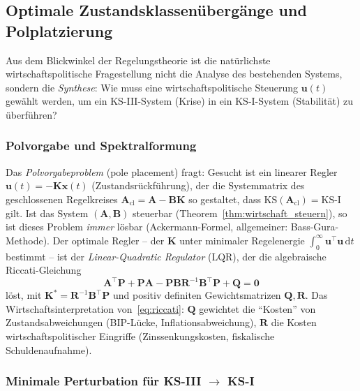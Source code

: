 \documentclass[a4paper, 12pt, twoside, openright]{report}
\theoremstyle{definition}
\theoremstyle{definition}
\newcommand{\vx}{\bm{x}}
\newcommand{\vu}{\bm{u}}
\newcommand{\vA}{\bm{A}}
\newcommand{\vB}{\bm{B}}
\newcommand{\vP}{\bm{P}}
\newcommand{\vQ}{\bm{Q}}
\newcommand{\vK}{\bm{K}}
\newcommand{\vR}{\bm{R}}
\newcommand{\T}{\top}
\newcommand{\KS}{\mathrm{KS}}
\begin{document}
\subsection{Optimale Zustandsklassenübergänge und Polplatzierung}
\label{subsec:polplatz}

Aus dem Blickwinkel der Regelungstheorie ist die natürlichste wirtschaftspolitische
Fragestellung nicht die Analyse des bestehenden Systems, sondern die
\emph{Synthese}: Wie muss eine wirtschaftspolitische Steuerung $\vu(t)$ gewählt
werden, um ein KS-III-System (Krise) in ein KS-I-System (Stabilität)
zu überführen?

\subsubsection*{Polvorgabe und Spektralformung}

Das \emph{Polvorgabeproblem} (pole placement) fragt: Gesucht ist ein linearer
Regler $\vu(t) = -\vK\vx(t)$ (Zustandsrückführung), der die Systemmatrix des
geschlossenen Regelkreises $\vA_{\mathrm{cl}} = \vA - \vB\vK$ so gestaltet, dass
$\KS(\vA_{\mathrm{cl}}) = \KS\text{-I}$ gilt. Ist das System $(\vA, \vB)$ steuerbar
(Theorem~\ref{thm:wirtschaft_steuern}), so ist dieses Problem \emph{immer} lösbar
(Ackermann-Formel, allgemeiner: Bass-Gura-Methode). Der optimale Regler -- der
$\vK$ unter minimaler Regelenergie $\int_0^\infty \vu^\T\vu\,\mathrm{d}t$ bestimmt --
ist der \emph{Linear-Quadratic Regulator} (LQR), der die algebraische Riccati-Gleichung
\begin{equation}
  \vA^\T\vP + \vP\vA - \vP\vB\vR^{-1}\vB^\T\vP + \vQ = \bm{0}
  \label{eq:riccati}
\end{equation}
löst, mit $\vK^* = \vR^{-1}\vB^\T\vP$ und positiv definiten Gewichtsmatrizen
$\vQ, \vR$. Das Wirtschaftsinterpretation von~\eqref{eq:riccati}: $\vQ$ gewichtet
die ``Kosten'' von Zustandsabweichungen (BIP-Lücke, Inflationsabweichung),
$\vR$ die Kosten wirtschaftspolitischer Eingriffe (Zinssenkungskosten,
fiskalische Schuldenaufnahme).

\subsubsection*{Minimale Perturbation für KS-III $\to$ KS-I}
\end{document}

